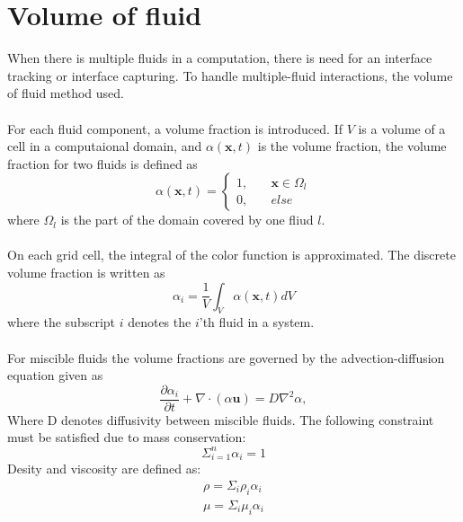 \documentclass[a4paper, 12pt]{report}
\begin{document}
\section{Volume of fluid}
When there is multiple fluids in a computation, there is need for an interface tracking or interface capturing. To handle multiple-fluid interactions, the volume of fluid method used.\\
\\
For each fluid component, a volume fraction is introduced. If $V$ is a volume of a cell in a computaional domain, and $\alpha(\mathbf{x}, t)$ is the volume fraction, the volume fraction for two fluids is defined as \citep{VOF2}
\begin{equation}
\alpha(\mathbf{x},t) = \left\{
        \begin{array}{ll}
            1, & \quad \mathbf{x} \in \Omega_l \\
            0, & \quad else
        \end{array}
    \right.
\label{eqn:volumeFraction}    
\end{equation}
where $\Omega_l$ is the part of the domain covered by one fliud $l$.\\
\\
On each grid cell, the integral of the color function is approximated. The discrete volume fraction is written as \citep{VOF2}
\begin{equation}
\alpha_i = \frac{1}{V} \int_{V} \alpha(\mathbf{x},t) dV
\end{equation}
where the subscript $i$ denotes the $i$'th fluid in a system.\\
\\
For miscible fluids the volume fractions are governed by the advection-diffusion equation given as \citep{VOF1}
\begin{equation}
\frac{\partial \alpha_i}{\partial t} + \nabla \cdot (\alpha \mathbf{u}) = D\nabla^2 \alpha,
\label{eqn:alphadiffusionEquation}
\end{equation} 
Where D denotes diffusivity between miscible fluids. The following constraint must be satisfied due to mass conservation:
\begin{equation}
\Sigma_{i=1}^n \alpha_i= 1
\label{eqn:alphaConstraint} 
\end{equation}
Desity and viscosity are defined as:
\begin{eqnarray}
\label{eqn:alphaRhodiffusion}
\rho = \Sigma_i \rho_i \alpha_i \\
\label{eqn:alphaMudiffusion}
\mu = \Sigma_i \mu_i \alpha_i
\end{eqnarray}
\end{document}
